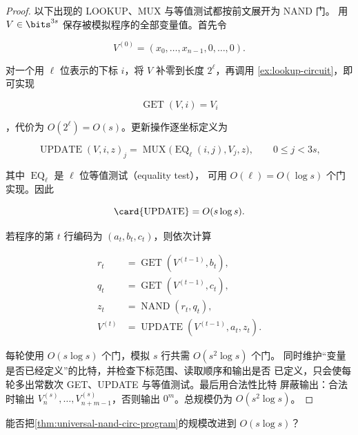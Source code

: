 \begin{proof}
  以下出现的 LOOKUP、MUX 与等值测试都按前文展开为 NAND 门。
  用 $V\in\bits^{3s}$ 保存被模拟程序的全部变量值。首先令

  \[
    V^{(0)}=(x_0,\ldots,x_{n-1},0,\ldots,0).
  \]

  对一个用 $\ell$ 位表示的下标 $i$，将 $V$ 补零到长度 $2^\ell$，再调用
  \cref{ex:lookup-circuit}，即可实现

  \[
    \operatorname{GET}(V,i)=V_i
  \]

  ，代价为 $O(2^\ell)=O(s)$。更新操作逐坐标定义为

  \[
    \operatorname{UPDATE}(V,i,z)_j
    =\operatorname{MUX}\bigl(
      \operatorname{EQ}_{\ell}(i,j),V_j,z
    \bigr),
    \qquad 0\leq j<3s,
  \]

  其中 $\operatorname{EQ}_{\ell}$ 是 $\ell$ 位等值测试（equality test），
  可用 $O(\ell)=O(\log s)$ 个门实现。因此

  \[
    \card{\operatorname{UPDATE}}=O(s\log s).
  \]

  若程序的第 $t$ 行编码为 $(a_t,b_t,c_t)$，则依次计算

  \begin{align*}
    r_t&=\operatorname{GET}(V^{(t-1)},b_t),\\
    q_t&=\operatorname{GET}(V^{(t-1)},c_t),\\
    z_t&=\operatorname{NAND}(r_t,q_t),\\
    V^{(t)}&=\operatorname{UPDATE}(V^{(t-1)},a_t,z_t).
  \end{align*}

  每轮使用 $O(s\log s)$ 个门，模拟 $s$ 行共需 $O(s^2\log s)$ 个门。
  同时维护“变量是否已经定义”的比特，并检查下标范围、读取顺序和输出是否
  已定义，只会使每轮多出常数次 GET、UPDATE 与等值测试。最后用合法性比特
  屏蔽输出：合法时输出 $V_n^{(s)},\ldots,V_{n+m-1}^{(s)}$，否则输出
  $0^m$。总规模仍为 $O(s^2\log s)$。
\end{proof}

\begin{question}
  能否把\cref{thm:universal-nand-circ-program}的规模改进到
  $O(s\log s)$？
\end{question}
